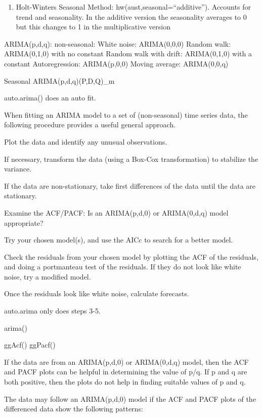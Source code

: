 \documentclass[]{book}
\providecommand{\tightlist}{%
  \setlength{\itemsep}{0pt}\setlength{\parskip}{0pt}}
\begin{document}
\begin{enumerate}
\def\labelenumi{\arabic{enumi}.}
\setcounter{enumi}{7}
\tightlist
\item
  Holt-Winters Seasonal Method: hw(aust,seasonal=``additive''). Accounts
  for trend and seasonality. In the additive version the seasonality
  averages to 0 but this changes to 1 in the multiplicative version
\end{enumerate}

ARIMA(p,d,q): non-seasonal: White noise: ARIMA(0,0,0) Random walk:
ARIMA(0,1,0) with no constant Random walk with drift: ARIMA(0,1,0) with
a constant Autoregression: ARIMA(p,0,0) Moving average: ARIMA(0,0,q)

Seasonal ARIMA(p,d,q)(P,D,Q)\_m

auto.arima() does an auto fit.

When fitting an ARIMA model to a set of (non-seasonal) time series data,
the following procedure provides a useful general approach.

Plot the data and identify any unusual observations.

If necessary, transform the data (using a Box-Cox transformation) to
stabilize the variance.

If the data are non-stationary, take first differences of the data until
the data are stationary.

Examine the ACF/PACF: Is an ARIMA(p,d,0) or ARIMA(0,d,q) model
appropriate?

Try your chosen model(s), and use the AICc to search for a better model.

Check the residuals from your chosen model by plotting the ACF of the
residuals, and doing a portmanteau test of the residuals. If they do not
look like white noise, try a modified model.

Once the residuals look like white noise, calculate forecasts.

auto.arima only does steps 3-5.

arima()

ggAcf() \textbar{} ggPacf()

If the data are from an ARIMA(p,d,0) or ARIMA(0,d,q) model, then the ACF
and PACF plots can be helpful in determining the value of p/q. If p and
q are both positive, then the plots do not help in finding suitable
values of p and q.

The data may follow an ARIMA(p,d,0) model if the ACF and PACF plots of
the differenced data show the following patterns:
\end{document}

